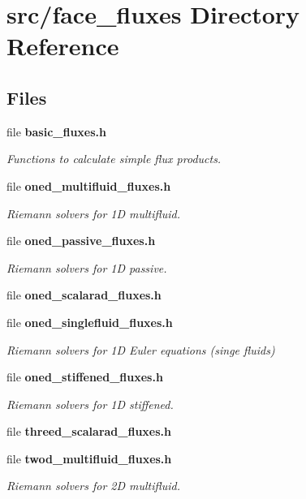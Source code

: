 \section{src/face\-\_\-fluxes Directory Reference}
\label{dir_071a843280fedf487c11ff88c9395300}
\subsection*{Files}
\begin{DoxyCompactItemize}
\item 
file {\bf basic\-\_\-fluxes.\-h}
\begin{DoxyCompactList}\small\item\em Functions to calculate simple flux products. \end{DoxyCompactList}\item 
file {\bf oned\-\_\-multifluid\-\_\-fluxes.\-h}
\begin{DoxyCompactList}\small\item\em Riemann solvers for 1\-D multifluid. \end{DoxyCompactList}\item 
file {\bf oned\-\_\-passive\-\_\-fluxes.\-h}
\begin{DoxyCompactList}\small\item\em Riemann solvers for 1\-D passive. \end{DoxyCompactList}\item 
file {\bfseries oned\-\_\-scalarad\-\_\-fluxes.\-h}
\item 
file {\bf oned\-\_\-singlefluid\-\_\-fluxes.\-h}
\begin{DoxyCompactList}\small\item\em Riemann solvers for 1\-D Euler equations (singe fluids) \end{DoxyCompactList}\item 
file {\bf oned\-\_\-stiffened\-\_\-fluxes.\-h}
\begin{DoxyCompactList}\small\item\em Riemann solvers for 1\-D stiffened. \end{DoxyCompactList}\item 
file {\bfseries threed\-\_\-scalarad\-\_\-fluxes.\-h}
\item 
file {\bf twod\-\_\-multifluid\-\_\-fluxes.\-h}
\begin{DoxyCompactList}\small\item\em Riemann solvers for 2\-D multifluid. \end{DoxyCompactList}\item 

\end{DoxyCompactItemize}
